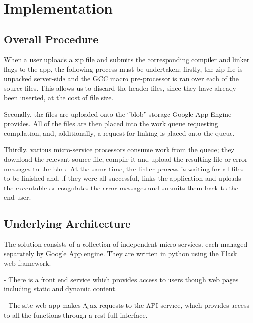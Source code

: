 \documentclass[conference]{IEEEtran}
\begin{document}

\section{Implementation}
\subsection{Overall Procedure}
When a user uploads a zip file and submits the corresponding compiler and linker
flags to the app, the following process must be undertaken; firstly, the zip
file is unpacked server-side and the GCC macro pre-processor is ran over each of
the source files. This allows us to discard the header files, since they have
already been inserted, at the cost of file size. 

Secondly, the files are uploaded onto the ``blob'' storage Google App Engine
provides. All of the files are then placed into the work queue requesting
compilation, and, additionally, a request for linking is placed onto the queue.

Thirdly, various micro-service processors consume work from the queue; they
download the relevant source file, compile it and upload the resulting file or
error messages to the blob. At the same time, the linker process is waiting for
all files to be finished and, if they were all successful, links the
application and uploads the executable or coagulates the error messages and
submits them back to the end user.
\subsection{Underlying Architecture}

The solution consists of a collection of independent micro services, each managed separately by Google App engine. They are written in python using the Flask web framework.

- There is a front end service which provides access to users though web pages including static and dynamic content.

- The site web-app makes Ajax requests to the API service, which provides access to all the functions through a rest-full interface.
\end{document}
